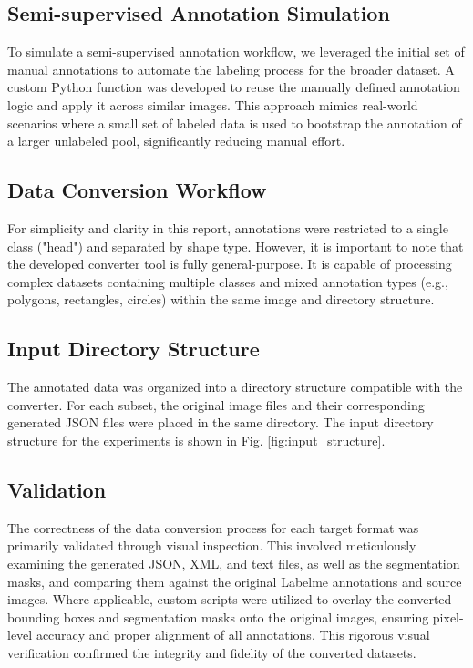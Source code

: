 \documentclass[conference]{IEEEtran}
\begin{document}
\subsection{Semi-supervised Annotation Simulation}

To simulate a semi-supervised annotation workflow, we leveraged the initial set
of manual annotations to automate the labeling process for the broader dataset.
A custom Python function was developed to reuse the manually defined annotation
logic and apply it across similar images. This approach mimics real-world
scenarios where a small set of labeled data is used to bootstrap the annotation
of a larger unlabeled pool, significantly reducing manual effort.

\subsection{Data Conversion Workflow}

For simplicity and clarity in this report, annotations were restricted to a
single class ("head") and separated by shape type. However, it is important to
note that the developed converter tool is fully general-purpose. It is capable
of processing complex datasets containing multiple classes and mixed annotation
types (e.g., polygons, rectangles, circles) within the same image and directory
structure.

\subsection{Input Directory Structure}

The annotated data was organized into a directory structure compatible with the
converter. For each subset, the original image files and their corresponding
generated JSON files were placed in the same directory. The input directory
structure for the experiments is shown in Fig. \ref{fig:input_structure}.

\subsection{Validation}

The correctness of the data conversion process for each target format was
primarily validated through visual inspection. This involved meticulously
examining the generated JSON, XML, and text files, as well as the segmentation
masks, and comparing them against the original Labelme annotations and source
images. Where applicable, custom scripts were utilized to overlay the converted
bounding boxes and segmentation masks onto the original images, ensuring
pixel-level accuracy and proper alignment of all annotations. This rigorous
visual verification confirmed the integrity and fidelity of the converted
datasets.
\end{document}
